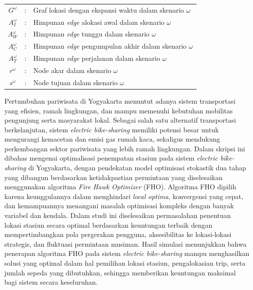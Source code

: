 \documentclass{skripsimathugm}
\begin{document}
\begin{tabular}{ccp{10.5cm}}
$G^\omega$ &:&  Graf lokasi dengan ekspansi waktu dalam skenario $\omega$\\
$A_I^\omega$ &:&  Himpunan \textit{edge} alokasi awal dalam skenario $\omega$\\
$A_W^\omega$ &:&  Himpunan \textit{edge} tunggu dalam skenario $\omega$\\
$A_C^\omega$ &:&  Himpunan \textit{edge} pengumpulan akhir dalam skenario $\omega$\\
$A_T^\omega$ &:&  Himpunan \textit{edge} perjalanan dalam skenario $\omega$\\
$r^\omega$ &:&  Node akar dalam skenario $\omega$\\
$s^\omega$ &:&  Node tujuan dalam skenario $\omega$\\
\end{tabular}


\begin{abstractind}
    Pertumbuhan pariwisata di Yogyakarta menuntut adanya sistem transportasi yang efisien, ramah lingkungan, dan mampu memenuhi kebutuhan mobilitas pengunjung serta masyarakat lokal. Sebagai salah satu alternatif transportasi berkelanjutan, sistem \textit{electric bike-sharing} memiliki potensi besar untuk mengurangi kemacetan dan emisi gas rumah kaca, sekaligus mendukung perkembangan sektor pariwisata yang lebih ramah lingkungan. Dalam skripsi ini dibahas mengenai optimalisasi penempatan stasiun pada sistem \textit{electric bike-sharing} di Yogyakarta, dengan pendekatan model optimisasi stokastik dua tahap yang dibangun berdasarkan ketidakpastian permintaan yang diselesaikan menggunakan algoritma \textit{Fire Hawk Optimizer} (FHO). Algoritma FHO dipilih karena keunggulannya dalam menghindari \textit{local optima}, konvergensi yang cepat, dan kemampuannya menangani masalah optimisasi kompleks dengan banyak variabel dan kendala. Dalam studi ini diselesaikan permasalahan penentuan lokasi stasiun secara optimal berdasarkan keuntungan terbaik dengan mempertimbangkan pola pergerakan pengguna, aksesibilitas ke lokasi-lokasi strategis, dan fluktuasi permintaan musiman. Hasil simulasi menunjukkan bahwa penerapan algoritma FHO pada sistem \textit{electric bike-sharing} mampu menghasilkan solusi yang optimal dalam hal pemilihan lokasi stasiun, pengalokasian trip, serta jumlah sepeda yang dibutuhkan, sehingga memberikan keuntungan maksimal bagi sistem secara keseluruhan.
\end{abstractind}
\end{document}
